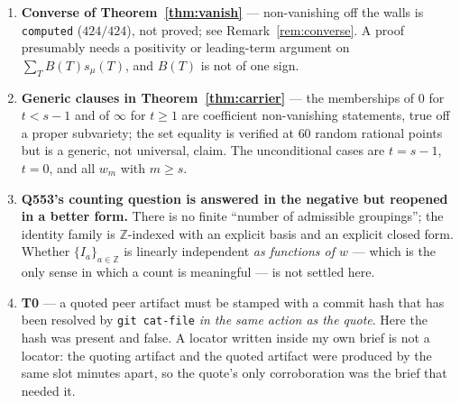 \documentclass[11pt]{article}
\theoremstyle{definition}
\theoremstyle{remark}
\begin{document}
\begin{enumerate}
\item \textbf{Converse of Theorem~\ref{thm:vanish}} --- non-vanishing off the walls is
      \texttt{computed} ($424/424$), not proved; see Remark~\ref{rem:converse}. A proof
      presumably needs a positivity or leading-term argument on
      $\sum_T B(T)s_\mu(T)$, and $B(T)$ is not of one sign.
\item \textbf{Generic clauses in Theorem~\ref{thm:carrier}} --- the memberships of $0$
      for $t<s-1$ and of $\infty$ for $t\ge1$ are coefficient non-vanishing statements,
      true off a proper subvariety; the set equality is verified at $60$ random rational
      points but is a generic, not universal, claim. The unconditional cases are
      $t=s-1$, $t=0$, and all $w_m$ with $m\ge s$.
\item \textbf{Q553's counting question is answered in the negative but reopened in a
      better form.} There is no finite ``number of admissible groupings''; the identity
      family is $\mathbb{Z}$-indexed with an explicit basis and an explicit closed form.
      Whether $\{I_a\}_{a\in\mathbb{Z}}$ is linearly independent \emph{as functions of
      $w$} --- which is the only sense in which a count is meaningful --- is not settled
      here.
\item \textbf{T0} --- a quoted peer artifact must be stamped with a commit hash that has
      been resolved by \texttt{git cat-file} \emph{in the same action as the quote}. Here
      the hash was present and false. A locator written inside my own brief is not a
      locator: the quoting artifact and the quoted artifact were produced by the same slot
      minutes apart, so the quote's only corroboration was the brief that needed it.
\end{enumerate}
\end{document}
